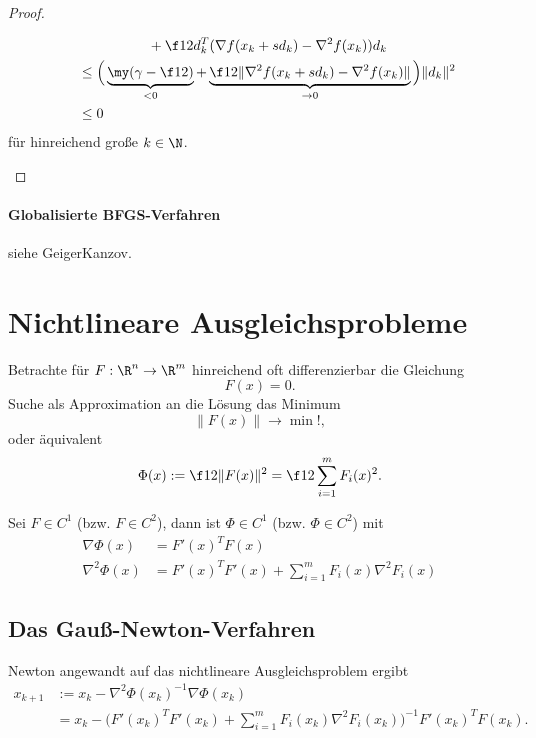 \begin{st}
\begin{proof}
\begin{enumerate}[(a)]
\begin{enumerate}[(i)]
\begin{align*}
							&\qquad\qquad\qquad + \f 12 d_k^T (\nabla f(x_k + sd_k) - \nabla^2 f(x_k)) d_k \\
							&\quad\le \Big(\underbrace{\my (\gamma - \f 12)}_{<0} + \underbrace{\f 12 \|\nabla^2 f(x_k + sd_k) - \nabla^2 f(x_k)\|}_{\to 0} \Big) \|d_k\|^2 \\
							&\quad\le 0
						\end{align*}
						für hinreichend große $k \in \N$.
				\end{enumerate}
		\end{enumerate}
	\end{proof}
\end{st}

\paragraph{Globalisierte BFGS-Verfahren}

siehe GeigerKanzov. %


\section{Nichtlineare Ausgleichsprobleme}


Betrachte für $F: \R^n \to \R^m$ hinreichend oft differenzierbar die Gleichung
\[
	F(x) = 0.
\]
Suche als Approximation an die Lösung das Minimum
\[
	\|F(x)\| \to \min!,
\]
oder äquivalent
\[
	\Phi(x)
	:= \f 12 \| F(x) \|^2
	= \f 12 \sum_{i = 1}^m F_i(x)^2.
\]


\begin{lem} \label{2.60}
	Sei $F \in C^1$ (bzw. $F \in C^2$), dann ist $\Phi \in C^1$ (bzw. $\Phi \in C^2$) mit
	\begin{align*}
		\nabla \Phi(x) &= F'(x)^T F(x) \\
		\nabla^2 \Phi(x) &= F'(x)^T F'(x) + \sum_{i=1}^m F_i(x) \nabla^2 F_i(x)
	\end{align*}
\end{lem}

\subsection{Das Gauß-Newton-Verfahren}

Newton angewandt auf das nichtlineare Ausgleichsproblem ergibt
\begin{align*}
	x_{k+1}
	&:= x_k - \nabla^2 \Phi(x_k)^{-1} \nabla \Phi(x_k) \\
	&= x_k - \Big(F'(x_k)^T F'(x_k) + \sum_{i=1}^m F_i(x_k) \nabla^2 F_i(x_k) \Big)^{-1} F'(x_k)^T F(x_k).
\end{align*}

